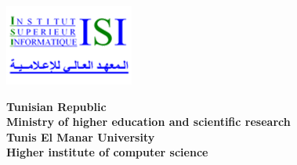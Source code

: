 


\thispagestyle{cover}%
\hspace{-47pt}
\begin{minipage}[l]{0.2\columnwidth}
\vspace{6mm}
\includegraphics[width=1.1\columnwidth]{LogoISI}\\
\end{minipage}
\hfill
\begin{minipage}[l]{0.6\columnwidth}
\centering
\footnotesize
\textbf{{Tunisian Republic}}\\
\vspace{1.5mm}
\textbf{{Ministry of higher education and scientific
 research}}\\
\vspace{1.5mm}
\textbf{{Tunis El Manar University}}\\
\vspace{1.5mm}
\textbf{{Higher institute of computer science}}
\end{minipage}
